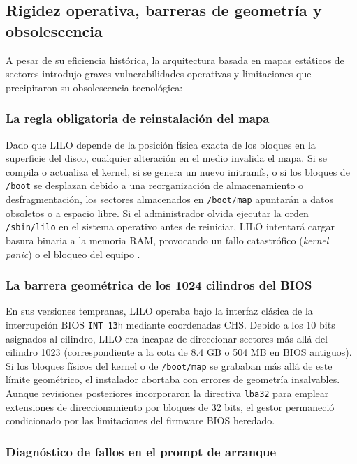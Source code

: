 \documentclass[12pt]{article}
\begin{document}
\subsection{Rigidez operativa, barreras de geometría y obsolescencia}
\label{subsec:rigidezObsolescenciaLilo}

A pesar de su eficiencia histórica, la arquitectura basada en mapas estáticos de sectores introdujo graves vulnerabilidades operativas y limitaciones que precipitaron su obsolescencia tecnológica:

\subsubsection{La regla obligatoria de reinstalación del mapa}

Dado que LILO depende de la posición física exacta de los bloques en la superficie del disco, cualquier alteración en el medio invalida el mapa. Si se compila o actualiza el kernel, si se genera un nuevo initramfs, o si los bloques de \texttt{/boot} se desplazan debido a una reorganización de almacenamiento o desfragmentación, los sectores almacenados en \texttt{/boot/map} apuntarán a datos obsoletos o a espacio libre. Si el administrador olvida ejecutar la orden \texttt{/sbin/lilo} en el sistema operativo antes de reiniciar, LILO intentará cargar basura binaria a la memoria RAM, provocando un fallo catastrófico (\textit{kernel panic}) o el bloqueo del equipo \parencite{almesberger2000lilo}.

\subsubsection{La barrera geométrica de los 1024 cilindros del BIOS}

En sus versiones tempranas, LILO operaba bajo la interfaz clásica de la interrupción BIOS \texttt{INT 13h} mediante coordenadas CHS. Debido a los 10 bits asignados al cilindro, LILO era incapaz de direccionar sectores más allá del cilindro 1023 (correspondiente a la cota de 8.4 GB o 504 MB en BIOS antiguos). Si los bloques físicos del kernel o de \texttt{/boot/map} se grababan más allá de este límite geométrico, el instalador abortaba con errores de geometría insalvables. Aunque revisiones posteriores incorporaron la directiva \texttt{lba32} para emplear extensiones de direccionamiento por bloques de 32 bits, el gestor permaneció condicionado por las limitaciones del firmware BIOS heredado.

\subsubsection{Diagnóstico de fallos en el prompt de arranque}
\end{document}
